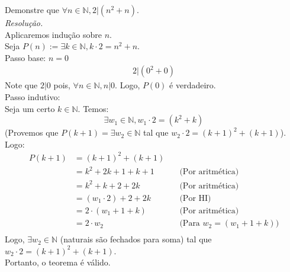 Demonstre que $\forall n \in \mathbb{N}, 2 | (n^2 + n)$. \\
\emph{Resolução.} \\
Aplicaremos indução sobre $n$. \\
Seja $P(n) := \exists k \in \mathbb{N}, k \cdot 2 = n^2 + n$. \\
Passo base: $n = 0$
\begin{align*}
    2 | (0^2 + 0)
\end{align*}
Note que $2 | 0$ pois, $\forall n \in \mathbb{N}, n | 0$. Logo, $P(0)$ é verdadeiro. \\
Passo indutivo: \\
Seja um certo $k \in \mathbb{N}$. Temos:
\begin{displaymath}
    \exists w_1 \in \mathbb{N}, w_1 \cdot 2 = (k^2 + k)
\end{displaymath}
(Provemos que $P(k + 1) = \exists w_2 \in \mathbb{N}$ tal que $w_2 \cdot 2 = (k + 1)^2 + (k + 1)$).
Logo:
\begin{align*}
    P(k + 1) & = (k + 1)^2 + (k + 1)                                                \\
             & = k^2 + 2k + 1 + k + 1   & \quad \text{(Por aritmética)}             \\
             & = k^2 + k + 2 + 2k       & \quad \text{(Por aritmética)}             \\
             & = (w_1 \cdot 2) + 2 + 2k & \quad \text{(Por HI)}                     \\
             & = 2 \cdot (w_1 + 1 + k)  & \quad \text{(Por aritmética)}             \\
             & = 2 \cdot w_2            & \quad \text{(Para $w_2 = (w_1 + 1 + k)$)} \\
\end{align*}
Logo, $\exists w_2 \in \mathbb{N}$ (naturais são fechados para soma) tal que $w_2 \cdot 2 = (k + 1)^2 + (k + 1)$. \\
Portanto, o teorema é válido.